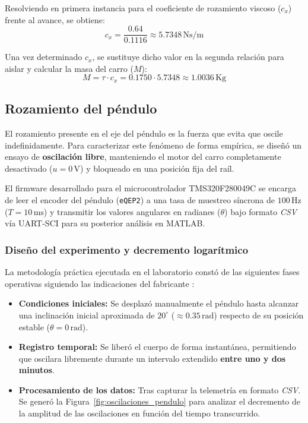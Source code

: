 \documentclass[11pt,fleqn]{book} %
\begin{document}
Resolviendo en primera instancia para el coeficiente de rozamiento viscoso ($c_x$) frente al avance, se obtiene:
\begin{equation}
	\boxed{c_x = \frac{0.64}{0.1116} \approx 5.7348\,\text{Ns/m}}
\end{equation}

Una vez determinado $c_x$, se sustituye dicho valor en la segunda relación para aislar y calcular la masa del carro ($M$):
\begin{equation}
	\boxed{M = \tau \cdot c_x = 0.1750 \cdot 5.7348 \approx 1.0036\,\text{Kg}}
\end{equation}

\subsection{Rozamiento del péndulo}
\label{sub:rozamiento_pendulo}

El rozamiento presente en el eje del péndulo es la fuerza que evita que oscile indefinidamente. Para caracterizar este fenómeno de forma empírica, se diseñó un ensayo de \textbf{oscilación libre}, manteniendo el motor del carro completamente desactivado ($u = 0\,\text{V}$) y bloqueado en una posición fija del raíl.

El firmware desarrollado para el microcontrolador TMS320F280049C se encarga de leer el encoder del péndulo (\texttt{eQEP2}) a una tasa de muestreo síncrona de $100\,\text{Hz}$ ($T = 10\,\text{ms}$) y transmitir los valores angulares en radianes ($\theta$) bajo formato \textit{CSV} vía UART-SCI para su posterior análisis en MATLAB.

\subsubsection{Diseño del experimento y decremento logarítmico}

La metodología práctica ejecutada en el laboratorio constó de las siguientes fases operativas siguiendo las indicaciones del fabricante \cite{feedback_pendulum_33005_manual}:
\begin{itemize}
	\item \textbf{Condiciones iniciales:} Se desplazó manualmente el péndulo hasta alcanzar una inclinación inicial aproximada de $20^\circ$ ($\approx 0.35\,\text{rad}$) respecto de su posición estable ($\theta = 0\,\text{rad}$).
	
	\item \textbf{Registro temporal:} Se liberó el cuerpo de forma instantánea, permitiendo que oscilara libremente durante un intervalo extendido \textbf{entre uno y dos minutos}.
	
	\item \textbf{Procesamiento de los datos:} Tras capturar la telemetría en formato \textit{CSV}. Se generó la Figura~\ref{fig:oscilaciones_pendulo} para analizar el decremento de la amplitud de las oscilaciones en función del tiempo transcurrido. 
\end{itemize}
\end{document}
